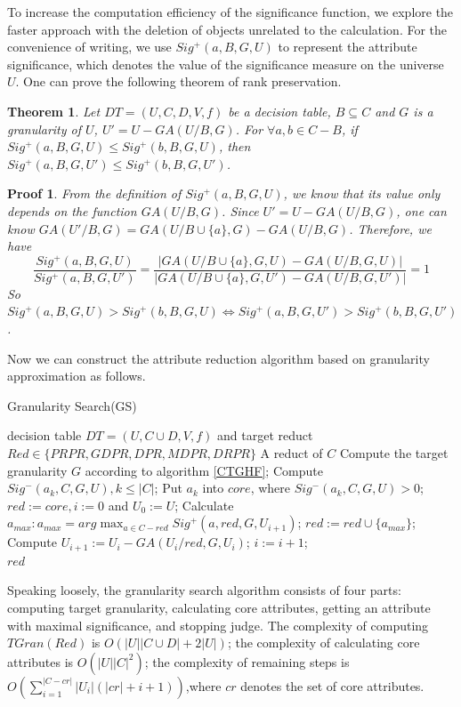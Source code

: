 \documentclass[review]{elsarticle}
\newtheorem{myTheo}{Theorem}
\newtheorem*{myPrf}{Proof}
\begin{document}
	\par To increase the computation efficiency of the significance function, we explore the faster approach with the deletion of objects unrelated to the calculation. For the convenience of writing, we use $Sig^+(a,B,G,U)$ to represent the attribute significance, which denotes the value of the significance measure on the universe $U$. One can prove the following theorem of rank preservation.
	\begin{myTheo}
		Let $DT=(U,C,D,V,f)$ be a decision table, $B \subseteq C$ and $G$ is a granularity of $U$, $U'=U-GA(U/B,G)$. For $\forall a,b\in C-B$, if $Sig^+(a,B,G,U) \leq Sig^+(b,B,G,U)$, then $Sig^+(a,B,G,U')\leq Sig^+(b,B,G,U')$.
	\end{myTheo}
	\begin{myPrf}
		From the definition of $Sig^+(a,B,G,U)$, we know that its value only depends on the function $GA(U/B,G)$. Since $U'=U-GA(U/B,G)$, one can know $GA(U'/B,G)=GA(U/B\cup\{a\},G)-GA(U/B,G)$. Therefore, we have
		\begin{equation*}
		\frac{Sig^+(a,B,G,U)}{Sig^+(a,B,G,U')}=\frac{|GA(U/B\cup\{a\},G,U)-GA(U/B,G,U)|}{|GA(U/B\cup\{a\},G,U')-GA(U/B,G,U')|}=1
		\end{equation*}
		So $Sig^+(a,B,G,U)>Sig^+(b,B,G,U) \Leftrightarrow Sig^+(a,B,G,U')>Sig^+(b,B,G,U')$.
	\end{myPrf}
	Now we can construct the attribute reduction algorithm based on granularity approximation as follows. 
	\begin{algorithm}[htb]
		\caption{Granularity Search(GS)}
		\label{GS}
		\begin{algorithmic}[1]
			\Require decision table $DT=(U, C \cup D,V,f)$ and target reduct $Red \in \{PRPR, GDPR, DPR, MDPR, DRPR\}$
			\Ensure A reduct of $C$
			\State Compute the target granularity $G$ according to algorithm \ref{CTGHF};
			\State Compute $Sig^-(a_k,C,G,U),k \leq |C|$;
			\State Put $a_k$ into $core$, where $Sig^-(a_k,C,G,U)>0$;
			\State $red:=core,i:=0$ and $U_0:=U$;
			\State Calculate $a_{max}:a_{max}=arg \max_{a \in C-red}Sig^+(a,red,G,U_{i+1})$;
			\State $red:=red \cup \{a_{max}\}$;
			\State Compute $U_{i+1}:=U_i-GA(U_i/red,G,U_i)$;
			\State $i:=i+1$;
			\EndWhile\\
			\Return $red$
		\end{algorithmic}
	\end{algorithm}
	\par Speaking loosely, the granularity search algorithm consists of four parts: computing target granularity, calculating core attributes, getting an attribute with maximal significance, and stopping judge. The complexity of computing $TGran(Red)$ is $O(|U||C\cup D|+2|U|)$; the complexity of calculating core attributes is $O(|U||C|^2)$; the complexity of remaining steps is $O(\sum_{i=1}^{|C-cr|}|U_i|(|cr|+i+1))$,where $cr$ denotes the set of core attributes.
\end{document}
